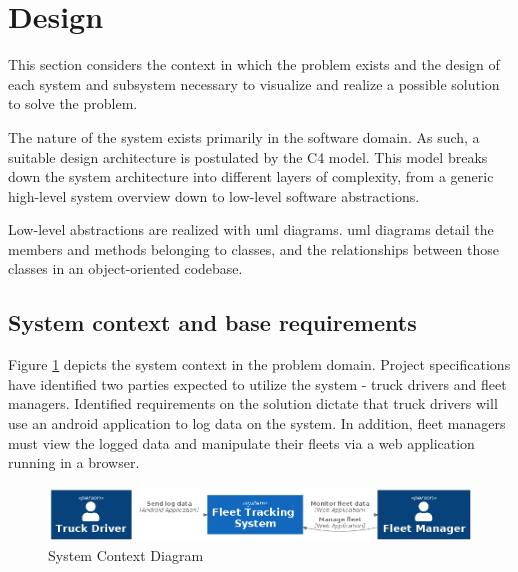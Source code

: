 \section{Design}
This section considers the context in which the problem exists and the design of each system and subsystem necessary to visualize and realize a possible solution to solve the problem.

The nature of the system exists primarily in the software domain.
As such, a suitable design architecture is postulated by the C4 model.
This model breaks down the system architecture into different layers of complexity, from a generic high-level system overview down to low-level software abstractions.\cite{vazquez2020c4}

Low-level abstractions are realized with \ac{uml} diagrams. \Ac{uml} diagrams detail the members and methods belonging to classes, and the relationships between those classes in an object-oriented codebase. \cite{petre2013uml}

\subsection{System context and base requirements }
Figure \ref{fig:system_context} depicts the system context in the problem domain.
Project specifications have identified two parties expected to utilize the system - truck drivers and fleet managers.
Identified requirements on the solution dictate that truck drivers will use an android application to log data on the system.
In addition, fleet managers must view the logged data and manipulate their fleets via a web application running in a browser.

\begin{figure}[H]
\centering
\includegraphics[width=6in]{../diag/system_context.png}
\caption{System Context Diagram}
\label{fig:system_context}
\end{figure}

